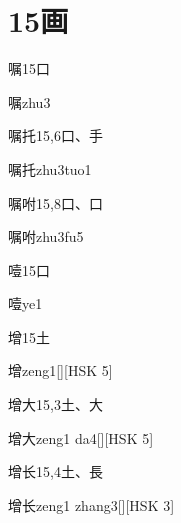 
\section*{15画}

\begin{entry}{嘱}{15}{⼝}
  \begin{phonetics}{嘱}{zhu3}
  \end{phonetics}
\end{entry}

\begin{entry}{嘱托}{15,6}{⼝、⼿}
  \begin{phonetics}{嘱托}{zhu3tuo1}
  \end{phonetics}
\end{entry}

\begin{entry}{嘱咐}{15,8}{⼝、⼝}
  \begin{phonetics}{嘱咐}{zhu3fu5}
  \end{phonetics}
\end{entry}

\begin{entry}{噎}{15}{⼝}
  \begin{phonetics}{噎}{ye1}
  \end{phonetics}
\end{entry}

\begin{entry}{增}{15}{⼟}
  \begin{phonetics}{增}{zeng1}[][HSK 5]
  \end{phonetics}
\end{entry}

\begin{entry}{增大}{15,3}{⼟、⼤}
  \begin{phonetics}{增大}{zeng1 da4}[][HSK 5]
  \end{phonetics}
\end{entry}

\begin{entry}{增长}{15,4}{⼟、⾧}
  \begin{phonetics}{增长}{zeng1 zhang3}[][HSK 3]
  \end{phonetics}
\end{entry}

